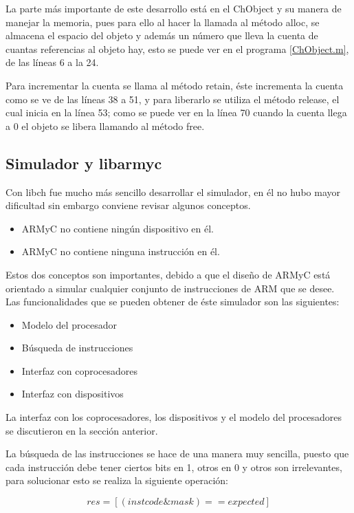 La parte más importante de este desarrollo está en el ChObject y su manera de manejar la memoria, pues para ello al hacer la llamada al método alloc, se almacena el espacio del objeto y además un número que lleva la cuenta de cuantas referencias al objeto hay, esto se puede ver en el programa \ref{ChObject.m}, de las líneas 6 a la 24.

Para incrementar la cuenta se llama al método retain, éste incrementa la cuenta como se ve de las líneas 38 a 51, y para liberarlo se utiliza el método release, el cual inicia en la línea 53; como se puede ver en la línea 70 cuando la cuenta llega a 0 el objeto se libera llamando al método free.

\subsection{Simulador y libarmyc}

Con libch fue mucho más sencillo desarrollar el simulador, en él no hubo mayor dificultad sin embargo conviene revisar algunos conceptos.

\begin{itemize}
\item ARMyC no contiene ningún dispositivo en él.
\item ARMyC no contiene ninguna instrucción en él.
\end{itemize}

Estos dos conceptos son importantes, debido a que el diseño de ARMyC está orientado a simular cualquier conjunto de instrucciones de ARM que se desee. Las funcionalidades que se pueden obtener de éste simulador son las siguientes:

\begin{itemize}
\item Modelo del procesador
\item Búsqueda de instrucciones
\item Interfaz con coprocesadores
\item Interfaz con dispositivos
\end{itemize}

La interfaz con los coprocesadores, los dispositivos y el modelo del procesadores se discutieron en la sección anterior.

La búsqueda de las instrucciones se hace de una manera muy sencilla, puesto que cada instrucción debe tener ciertos bits en 1, otros en 0 y otros son irrelevantes, para solucionar esto se realiza la siguiente operación:

\begin{equation}
res = [(instcode \& mask) == expected]
\end{equation}

